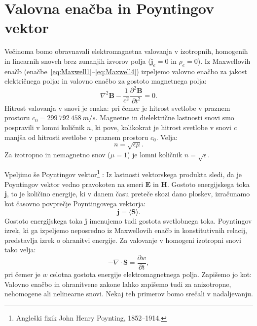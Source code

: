 \section{Valovna enačba in Poyntingov vektor}
Večinoma bomo obravnavali elektromagnetna valovanja v izotropnih, 
homogenih in linearnih snoveh brez zunanjih izvorov polja ($\mathbf{j}_e=0$ in $\rho_{e}=0$). 
Iz Maxwellovih enačb (enačbe~\ref{eq:Maxwell1}--\ref{eq:Maxwell4}) izpeljemo valovno
enačbo za jakost električnega polja:
in valovno enačbo za gostoto magnetnega polja: 
\begin{equation}
\label{eq:valovna-skalarna-B}
\nabla^{2}\mathbf{B}-\frac{1}{c^{2}}\frac{\partial^{2}\mathbf{B}}{\partial t^{2}} = 0.
\end{equation}
Hitrost valovanja v snovi je enaka:
pri čemer je hitrost svetlobe v praznem prostoru $c_0 = 299~792~458~\si{m/s}$. 
Magnetne in dielektrične lastnosti snovi smo pospravili
v lomni količnik $n$, ki pove, kolikokrat je hitrost 
svetlobe v snovi $c$ manjša od hitrosti svetlobe v praznem prostoru $c_0$. Velja:
\begin{equation}
n=\sqrt{\epsilon\mu}.
\end{equation}
Za izotropno in nemagnetno snov ($\mu=1$) je lomni količnik $n=\sqrt{\epsilon}$.

Vpeljimo še Poyntingov 
vektor\footnote{Angleški fizik John Henry Poynting, 1852--1914.} 
:
Iz lastnosti vektorskega produkta sledi, da je Poyntingov vektor vedno pravokoten na 
smeri $\mathbf{E}$ in $\mathbf{H}$. Gostoto energijskega toka $\mathbf{j}$, to je količino
energije, ki v danem času preteče skozi dano ploskev, izračunamo kot časovno 
povprečje Poyntingovega vektorja:
\begin{equation}
\mathbf{j}=\langle \mathbf{\mathbf{S}}\rangle\!.
\label{eq:jscal}
\end{equation}
Gostoto energijskega 
toka $\mathbf{j}$ imenujemo tudi gostota svetlobnega 
toka.
Poyntingov izrek, ki ga izpeljemo neposredno 
iz Maxwellovih enačb in konstitutivnih relacij, predstavlja izrek o ohranitvi 
energije. Za valovanje v homogeni izotropni snovi tako velja:
\begin{equation}
-\nabla\cdot\mathbf{S}=\frac{\partial w}{\partial t},
\end{equation}
pri čemer je $w$ celotna
gostota energije elektromagnetnega polja. Zapišemo jo kot:
Valovno enačbo in ohranitvene zakone lahko zapišemo tudi za anizotropne,
nehomogene ali nelinearne snovi. Nekaj teh primerov bomo srečali v nadaljevanju.


